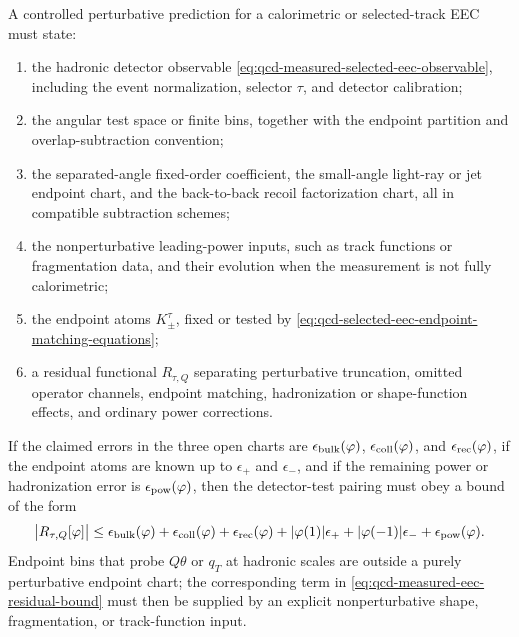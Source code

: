 \begin{controlledapproximation}
\label{ca:qcd-measured-eec-prediction}
A controlled perturbative prediction for a calorimetric or selected-track EEC
must state:
\begin{enumerate}
  \item the hadronic detector observable
  \eqref{eq:qcd-measured-selected-eec-observable}, including the event
  normalization, selector \(\tau\), and detector calibration;
  \item the angular test space or finite bins, together with the endpoint
  partition and overlap-subtraction convention;
  \item the separated-angle fixed-order coefficient, the small-angle
  light-ray or jet endpoint chart, and the back-to-back recoil factorization
  chart, all in compatible subtraction schemes;
  \item the nonperturbative leading-power inputs, such as track functions or
  fragmentation data, and their evolution when the measurement is not fully
  calorimetric;
  \item the endpoint atoms \(K_\pm^\tau\), fixed or tested by
  \eqref{eq:qcd-selected-eec-endpoint-matching-equations};
  \item a residual functional \(R_{\tau,Q}\) separating perturbative
  truncation, omitted operator channels, endpoint matching, hadronization or
  shape-function effects, and ordinary power corrections.
\end{enumerate}
If the claimed errors in the three open charts are
\(\epsilon_{\rm bulk}(\varphi)\), \(\epsilon_{\rm coll}(\varphi)\), and
\(\epsilon_{\rm rec}(\varphi)\), if the endpoint atoms are known up to
\(\epsilon_+\) and \(\epsilon_-\), and if the remaining power or
hadronization error is \(\epsilon_{\rm pow}(\varphi)\), then the detector-test
pairing must obey a bound of the form
\begin{equation}
  \bigl|
    R_{\tau,Q}[\varphi]
  \bigr|
  \leq
  \epsilon_{\rm bulk}(\varphi)
  +
  \epsilon_{\rm coll}(\varphi)
  +
  \epsilon_{\rm rec}(\varphi)
  +
  |\varphi(1)|\epsilon_+
  +
  |\varphi(-1)|\epsilon_-
  +
  \epsilon_{\rm pow}(\varphi).
  \label{eq:qcd-measured-eec-residual-bound}
\end{equation}
Endpoint bins that probe \(Q\theta\) or \(q_T\) at hadronic scales are
outside a purely perturbative endpoint chart; the corresponding term in
\eqref{eq:qcd-measured-eec-residual-bound} must then be supplied by an
explicit nonperturbative shape, fragmentation, or track-function input.
\end{controlledapproximation}

